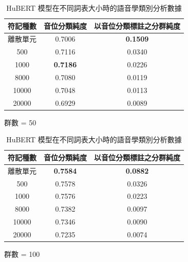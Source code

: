 \begin{table}[!htbp]
    \centering
    
    \begin{subtable}[t]{\textwidth}
        \centering
        \begin{tabular}{|c|c|c|} \hline 
                符記種數& 音位分類純度& 以音位分類標註之分群純度\\ \hline 
               離散單元&   0.7006&  \textbf{0.1509}
\\ \hline 
                   500    &  0.7116&  0.0340
\\ \hline 
                  1000    &  \textbf{0.7186}&  0.0226
\\ \hline 
                  8000    &  0.7080&  0.0119
\\ \hline 
                 10000    &  0.7048&  0.0113
\\ \hline 
                 20000    &  0.6929&  0.0089\\ \hline 
        \end{tabular}
\caption{群數 = 50}
        \label{tab:ch4-new-hubert-pcls-clu050}
    \end{subtable}        

    \vfill        

    \begin{subtable}[t]{\textwidth}
        \centering
        \begin{tabular}{|c|c|c|} \hline 
                符記種數& 音位分類純度& 以音位分類標註之分群純度\\ \hline 
               離散單元&   \textbf{0.7584}&  \textbf{0.0882}\\ \hline 
                   500    &  0.7578&  0.0326
\\ \hline 
                  1000    &  0.7576&  0.0223
\\ \hline 
                  8000    &  0.7382&  0.0097
\\ \hline 
                 10000    &  0.7346&  0.0090
\\ \hline 
                 20000    &  0.7235&  0.0074
\\ \hline 
        \end{tabular}
\caption{群數 = 100}
        \label{tab:ch4-new-hubert-pcls-clu100}
    \end{subtable}    

\caption{HuBERT 模型在不同詞表大小時的語音學類別分析數據}
    \label{tab:new--hubert-pcls-results}
\end{table}
